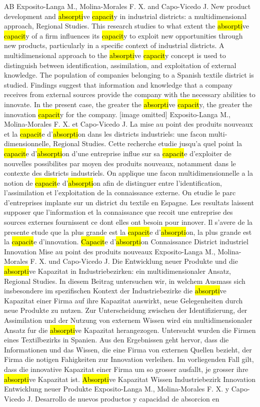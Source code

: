 \documentclass[a4paper]{article}
\begin{document}
AB \tabto{0cm}Exposito-Langa M., Molina-Morales F. X. and Capo-Vicedo J. New product development and \hl{absorpti}ve \hl{capacit}y in industrial districts: a multidimensional approach, Regional Studies. This research studies to what extent the \hl{absorpti}ve \hl{capacit}y of a firm influences its \hl{capacit}y to exploit new opportunities through new products, particularly in a specific context of industrial districts. A multidimensional approach to the \hl{absorpti}ve \hl{capacit}y concept is used to distinguish between identification, assimilation, and exploitation of external knowledge. The population of companies belonging to a Spanish textile district is studied. Findings suggest that information and knowledge that a company receives from external sources provide the company with the necessary abilities to innovate. In the present case, the greater the \hl{absorpti}ve \hl{capacit}y, the greater the innovation \hl{capacit}y for the company. [image omitted] Exposito-Langa M., Molina-Morales F. X. et Capo-Vicedo J. La mise au point des produits nouveaux et la \hl{capacit}e d'\hl{absorpti}on dans les districts industriels: une facon multi-dimensionnelle, Regional Studies. Cette recherche etudie jusqu'a quel point la \hl{capacit}e d'\hl{absorpti}on d'une entreprise influe sur sa \hl{capacit}e d'exploiter de nouvelles possibilites par moyen des produits nouveaux, notamment dans le contexte des districts industriels. On applique une facon multidimensionnelle a la notion de \hl{capacit}e d'\hl{absorpti}on afin de distinguer entre l'identification, l'assimilation et l'exploitation de la connaissance externe. On etudie le parc d'entreprises implante sur un district du textile en Espagne. Les resultats laissent supposer que l'information et la connaissance que recoit une entreprise des sources externes fournissent ce dont elles ont besoin pour innover. Il s'avere de la presente etude que la plus grande est la \hl{capacit}e d'\hl{absorpti}on, la plus grande est la \hl{capacit}e d'innovation. \hl{Capacit}e d'\hl{absorpti}on Connaissance District industriel Innovation Mise au point des produits nouveaux Exposito-Langa M., Molina-Morales F. X. und Capo-Vicedo J. Die Entwicklung neuer Produkte und die \hl{absorpti}ve Kapazitat in Industriebezirken: ein multidimensionaler Ansatz, Regional Studies. In diesem Beitrag untersuchen wir, in welchem Ausmass sich insbesondere im spezifischen Kontext der Industriebezirke die \hl{absorpti}ve Kapazitat einer Firma auf ihre Kapazitat auswirkt, neue Gelegenheiten durch neue Produkte zu nutzen. Zur Unterscheidung zwischen der Identifizierung, der Assimilation und der Nutzung von externem Wissen wird ein multidimensionaler Ansatz fur die \hl{absorpti}ve Kapazitat herangezogen. Untersucht wurden die Firmen eines Textilbezirks in Spanien. Aus den Ergebnissen geht hervor, dass die Informationen und das Wissen, die eine Firma von externen Quellen bezieht, der Firma die notigen Fahigkeiten zur Innovation verleihen. Im vorliegenden Fall gilt, dass die innovative Kapazitat einer Firma um so grosser ausfallt, je grosser ihre \hl{absorpti}ve Kapazitat ist. \hl{Absorpti}ve Kapazitat Wissen Industriebezirk Innovation Entwicklung neuer Produkte Exposito-Langa M., Molina-Morales F. X. y Capo-Vicedo J. Desarrollo de nuevos productos y capacidad de absorcion en 
\end{document}
